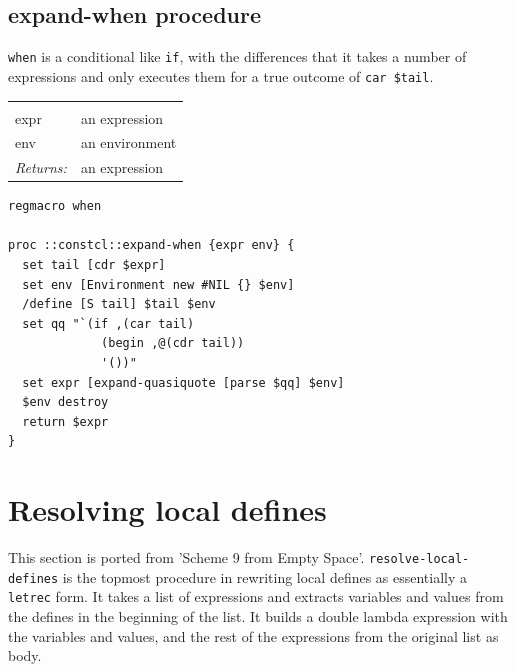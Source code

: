 \documentclass[twoside,9pt]{report}
\begin{document}
\subsection{expand-when procedure}
\label{expand-when-procedure}


\texttt{when} is a conditional like \texttt{if}, with the differences that it takes a number of expressions and only executes them for a true outcome of \texttt{car \$tail}.

\noindent\begin{tabular}{ |p{1.5cm} p{8cm}| }
\hline
\rowcolor[HTML]{CCCCCC} \multicolumn{2}{|l|}{\bf expand-when (internal)} \\
expr & an expression \\
env & an environment \\
\textit{Returns:} & an expression \\
\hline
\end{tabular}
\begin{lstlisting}
regmacro when
 
proc ::constcl::expand-when {expr env} {
  set tail [cdr $expr]
  set env [Environment new #NIL {} $env]
  /define [S tail] $tail $env
  set qq "`(if ,(car tail)
             (begin ,@(cdr tail))
             '())"
  set expr [expand-quasiquote [parse $qq] $env]
  $env destroy
  return $expr
}
\end{lstlisting}
\section{Resolving local defines}
\label{resolving-local-defines}


This section is ported from 'Scheme 9 from Empty Space'. \texttt{resolve-local-defines} is the topmost procedure in rewriting local defines as essentially a \texttt{letrec} form. It takes a list of expressions and extracts variables and values from the defines in the beginning of the list. It builds a double lambda expression with the variables and values, and the rest of the expressions from the original list as body.
\end{document}
